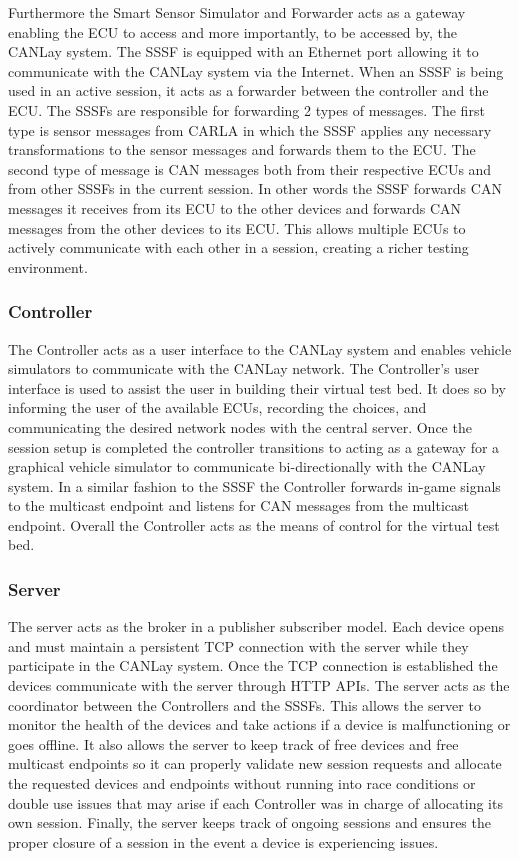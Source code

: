 \documentclass[letterpaper,twocolumn,12pt]{article}
\begin{document}
Furthermore the Smart Sensor Simulator and Forwarder acts as a gateway enabling the ECU to access and more importantly, to be accessed by, the CANLay system. The SSSF is equipped with an Ethernet port allowing it to communicate with the CANLay system via the Internet. When an SSSF is being used in an active session, it acts as a forwarder between the controller and the ECU. The SSSFs are responsible for forwarding 2 types of messages. The first type is sensor messages from CARLA in which the SSSF applies any necessary transformations to the sensor messages and forwards them to the ECU. The second type of message is CAN messages both from their respective ECUs and from other SSSFs in the current session. In other words the SSSF forwards CAN messages it receives from its ECU to the other devices and forwards CAN messages from the other devices to its ECU. This allows multiple ECUs to actively communicate with each other in a session, creating a richer testing environment.

\subsubsection{Controller}
The Controller acts as a user interface to the CANLay system and enables vehicle simulators to communicate with the CANLay network. The Controller’s user interface is used to assist the user in building their virtual test bed. It does so by informing the user of the available ECUs, recording the choices, and communicating the desired network nodes with the central server. Once the session setup is completed the controller transitions to acting as a gateway for a graphical vehicle simulator to communicate bi-directionally with the CANLay system. In a similar fashion to the SSSF the Controller forwards in-game signals to the multicast endpoint and listens for CAN messages from the multicast endpoint. Overall the Controller acts as the means of control for the virtual test bed.

\subsubsection{Server}
The server acts as the broker in a publisher subscriber model. Each device opens and must maintain a persistent TCP connection with the server while they participate in the CANLay system. Once the TCP connection is established the devices communicate with the server through HTTP APIs. The server acts as the coordinator between the Controllers and the SSSFs. This allows the server to monitor the health of the devices and take actions if a device is malfunctioning or goes offline. It also allows the server to keep track of free devices and free multicast endpoints so it can properly validate new session requests and allocate the requested devices and endpoints without running into race conditions or double use issues that may arise if each Controller was in charge of allocating its own session. Finally, the server keeps track of ongoing sessions and ensures the proper closure of a session in the event a device is experiencing issues.
\end{document}
